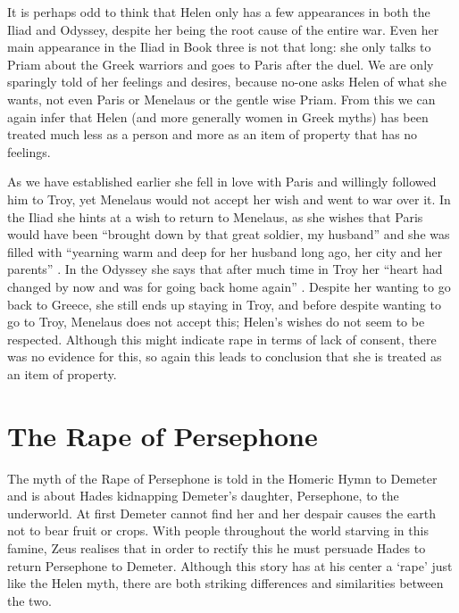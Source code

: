\documentclass[11pt]{article}
\begin{document}
It is perhaps odd to think that Helen only has a few appearances in both the Iliad and Odyssey, despite her being the root cause of the entire war.
Even her main appearance in the Iliad in Book three is not that long: she only talks to Priam about the Greek warriors and goes to Paris after the duel.
We are only sparingly told of her feelings and desires, because no-one asks Helen of what she wants, not even Paris or Menelaus or the gentle wise Priam.
From this we can again infer that Helen (and more generally women in Greek myths) has been treated much less as a person and more as an item of property that has no feelings.

As we have established earlier she fell in love with Paris and willingly followed him to Troy, yet Menelaus would not accept her wish and went to war over it.
In the Iliad she hints at a wish to return to Menelaus, as she wishes that Paris would have been ``brought down by that great soldier, my husband'' and she was filled with ``yearning warm and deep for her husband long ago, her city and her parents'' \cite[book 1, line 500/168]{iliad}.
In the Odyssey she says that after much time in Troy her ``heart had changed by now and was for going back home again'' \cite[book 11, line 260]{odyssey}.
Despite her wanting to go back to Greece, she still ends up staying in Troy, and before despite wanting to go to Troy, Menelaus does not accept this; Helen's wishes do not seem to be respected.
Although this might indicate rape in terms of lack of consent, there was no evidence for this, so again this leads to conclusion that she is treated as an item of property.


\section{The Rape of Persephone}
The myth of the Rape of Persephone is told in the Homeric Hymn to Demeter and is about Hades kidnapping Demeter's daughter, Persephone, to the underworld.
At first Demeter cannot find her and her despair causes the earth not to bear fruit or crops.
With people throughout the world starving in this famine, Zeus realises that in order to rectify this he must persuade Hades to return Persephone to Demeter.
Although this story has at his center a `rape' just like the Helen myth, there are both striking differences and similarities between the two.
\end{document}
